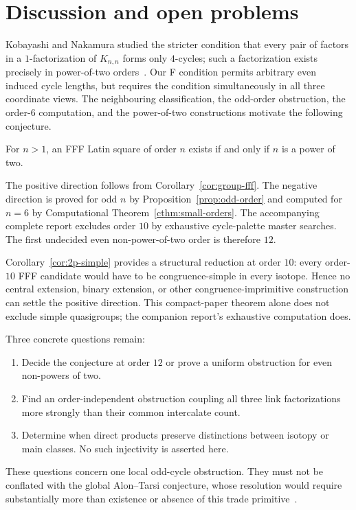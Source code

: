 \section{Discussion and open problems}

Kobayashi and Nakamura studied the stricter condition that every pair of
factors in a $1$-factorization of $K_{n,n}$ forms only $4$-cycles; such a
factorization exists precisely in power-of-two orders~\cite{KobayashiNakamura1994}.
Our F condition permits arbitrary even induced cycle lengths, but requires the
condition simultaneously in all three coordinate views.  The neighbouring
classification, the odd-order obstruction, the order-$6$ computation, and the
power-of-two constructions motivate the following conjecture.

\begin{conjecture}\label{conj:power-two}
For $n>1$, an FFF Latin square of order $n$ exists if and only if $n$ is a
power of two.
\end{conjecture}

The positive direction follows from Corollary~\ref{cor:group-fff}.  The
negative direction is proved for odd $n$ by Proposition~\ref{prop:odd-order}
and computed for $n=6$ by Computational Theorem~\ref{cthm:small-orders}.
The accompanying complete report excludes order $10$ by exhaustive
cycle-palette master searches.  The first undecided even non-power-of-two
order is therefore $12$.

Corollary~\ref{cor:2p-simple} provides a structural reduction at order $10$:
every order-$10$ FFF candidate would have to be congruence-simple
in every isotope.  Hence no central extension, binary extension, or other
congruence-imprimitive construction can settle the positive direction.  This
compact-paper theorem alone does not exclude simple quasigroups; the companion
report's exhaustive computation does.

Three concrete questions remain:
\begin{enumerate}
\item Decide the conjecture at order $12$ or prove a uniform obstruction for
even non-powers of two.
\item Find an order-independent obstruction coupling all three link
factorizations more strongly than their common intercalate count.
\item Determine when direct products preserve distinctions between isotopy or
main classes.  No such injectivity is asserted here.
\end{enumerate}

These questions concern one local odd-cycle obstruction.  They must not be
conflated with the global Alon--Tarsi conjecture, whose resolution would
require substantially more than existence or absence of this trade
primitive~\cite{AlonTarsi1992}.
